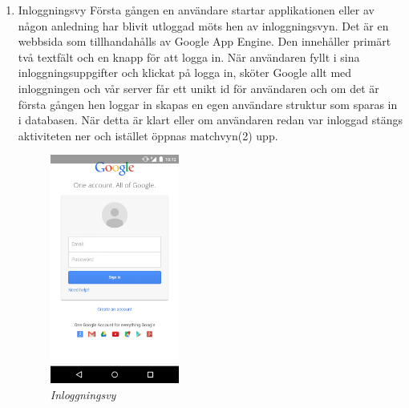\documentclass[a4paper, 11pt]{article}
\begin{document}
\begin{enumerate}
\item \large \textup{Inloggningsvy}
Första gången en användare startar applikationen eller av någon anledning har blivit utloggad möts hen av inloggningsvyn. Det är en webbsida som tillhandahålls av Google App Engine. Den innehåller primärt två textfält och en knapp för att logga in. När användaren fyllt i sina inloggningsuppgifter och klickat på logga in, sköter Google allt med inloggningen och vår server får ett unikt id för användaren och om det är första gången hen loggar in skapas en egen användare struktur som sparas in i databasen. När detta är klart eller om användaren redan var inloggad stängs aktiviteten ner och istället öppnas matchvyn(2) upp. 
\begin{figure}[H]
	\begin{center}
	\includegraphics[width=0.4\textwidth]{app_login} 
	\end{center}
	\caption{\textit{Inloggningsvy}}
\end{figure}


\end{enumerate}
\end{document}
